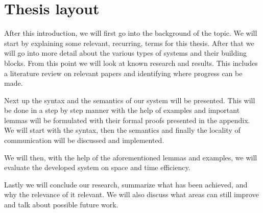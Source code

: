 \section{Thesis layout}
After this introduction, we will first go into the background of the topic. We will start by explaining some relevant, recurring, terms for this thesis. After that we will go into more detail about the various types of systems and their building blocks. From this point we will look at known research and results. This includes a literature review on relevant papers and identifying where progress can be made. 

Next up the syntax and the semantics of our system will be presented. This will be done in a step by step manner with the help of examples and important lemmas will be formulated with their formal proofs presented in the appendix. We will start with the syntax, then the semantics and finally the locality of communication will be discussed and implemented.

We will then, with the help of the aforementioned lemmas and examples, we will evaluate the developed system on space and time efficiency. 

Lastly we will conclude our research, summarize what has been achieved, and why the relevance of it relevant. We will also discuss what areas can still improve and talk about possible future work.




